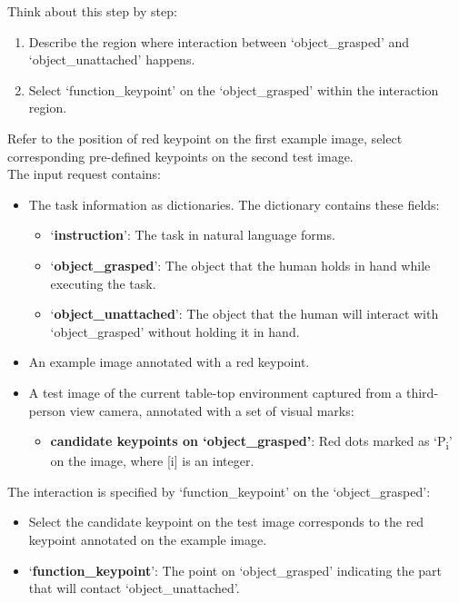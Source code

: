 \begin{center}
\begin{tcolorbox}[colback=gray!5, colframe=black!40, sharp corners=south, title= Function Point Detection Prompt]
Think about this step by step:
\begin{enumerate}[leftmargin=*, label=\arabic*.]
    \item Describe the region where interaction between `object\_grasped' and `object\_unattached' happens.
    \item Select `function\_keypoint' on the `object\_grasped' within the interaction region.
\end{enumerate}
\end{tcolorbox}
\end{center}


\begin{center}
\begin{tcolorbox}[colback=gray!5, colframe=black!40, sharp corners=south, title= Function Point Transfer Prompt]\small

Refer to the position of red keypoint on the first example image, select corresponding pre-defined keypoints on the second test image. \\

The input request contains:  
\begin{itemize}
    \item The task information as dictionaries. The dictionary contains these fields: 
    \begin{itemize}
        \item `\textbf{instruction}': The task in natural language forms.
        \item `\textbf{object\_grasped}': The object that the human holds in hand while executing the task.
        \item `\textbf{object\_unattached}': The object that the human will interact with `object\_grasped' without holding it in hand.
    \end{itemize}
    \item An example image annotated with a red keypoint.
    \item A test image of the current table-top environment captured from a third-person view camera, annotated with a set of visual marks:
    \begin{itemize}
        \item \textbf{candidate keypoints on `object\_grasped'}: Red dots marked as `P\textsubscript{i}' on the image, where [i] is an integer. \\
    \end{itemize}
\end{itemize}

The interaction is specified by `function\_keypoint' on the `object\_grasped':
\begin{itemize}
    \item Select the candidate keypoint on the test image corresponds to the red keypoint annotated on the example image.
    \item `\textbf{function\_keypoint}': The point on `object\_grasped' indicating the part that will contact `object\_unattached'. \\
\end{itemize}


\end{tcolorbox}
\end{center}
